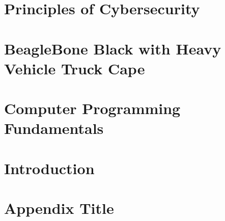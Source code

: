\chapter{Principles of Cybersecurity}


\chapter{BeagleBone Black with Heavy Vehicle Truck Cape}


\chapter{Computer Programming Fundamentals}


\chapter{Introduction}


\appendix
\chapter{Appendix Title}


